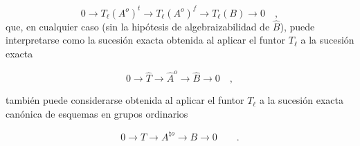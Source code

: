 \begin{equation}\tag{7.3.6}
0 \longrightarrow T_{\ell}(A^{o})^{t}
 \longrightarrow T_{\ell}(A^{o})^{f}
 \longrightarrow T_{\ell}(B) \longrightarrow 0 \quad ,
\end{equation}
que, en cualquier caso (sin la hipótesis de algebraizabilidad de
$\widehat B$), puede interpretarse como la sucesión exacta obtenida al
aplicar el funtor $T_{\ell}$ a la sucesión exacta

\begin{equation*}
0 \longrightarrow \widehat{T} \longrightarrow \widehat{A}^{o}
 \longrightarrow \widehat{B} \longrightarrow 0 \quad ,
\end{equation*}


también puede considerarse obtenida al aplicar el funtor $T_{\ell}$ a
la sucesión exacta canónica de esquemas en grupos ordinarios

\begin{equation*}
0 \longrightarrow T \longrightarrow A^{\natural o}
 \longrightarrow B \longrightarrow 0 \qquad .
\end{equation*}
